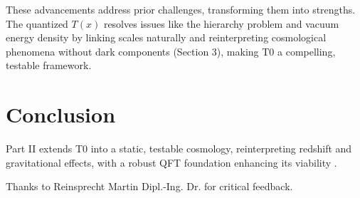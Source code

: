 \documentclass[twocolumn,aps,prl]{revtex4-2}
\newcommand{\Tfield}{T(x)}
\begin{document}
	These advancements address prior challenges, transforming them into strengths. The quantized \(\Tfield\) resolves issues like the hierarchy problem and vacuum energy density by linking scales naturally and reinterpreting cosmological phenomena without dark components (Section 3), making T0 a compelling, testable framework.
	
	\section{Conclusion}
	\label{sec:conclusion}
	
	Part II extends T0 into a static, testable cosmology, reinterpreting redshift and gravitational effects, with a robust QFT foundation enhancing its viability \cite{pascher_perspective_2025}.
	
	\begin{acknowledgments}
		Thanks to Reinsprecht Martin Dipl.-Ing. Dr. for critical feedback.
	\end{acknowledgments}
		
\end{document}
